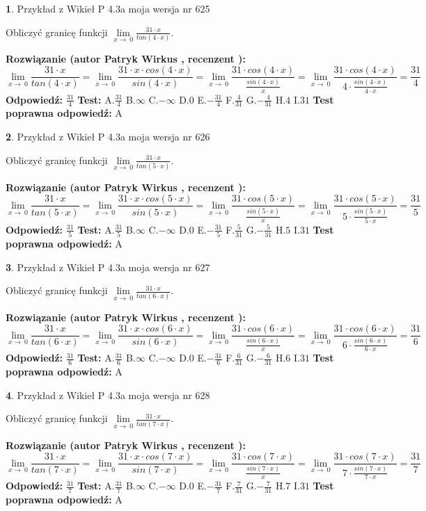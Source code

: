 \documentclass[12pt, a4paper]{article}
\theoremstyle{definition} %
\newtheorem{zad}{}
\newcommand{\zadStart}[1]{\begin{zad}#1\newline}
\newcommand{\zadStop}{\end{zad}}
\newcommand{\rozwStart}[2]{\noindent \textbf{Rozwiązanie (autor #1 , recenzent #2): }\newline}
\newcommand{\rozwStop}{\newline}
\newcommand{\odpStart}{\noindent \textbf{Odpowiedź:}\newline}
\newcommand{\odpStop}{\newline}
\newcommand{\testStart}{\noindent \textbf{Test:}\newline}
\newcommand{\testStop}{\newline}
\newcommand{\kluczStart}{\noindent \textbf{Test poprawna odpowiedź:}\newline}
\newcommand{\kluczStop}{\newline}
\begin{document}
\zadStart{Przykład z Wikieł P 4.3a moja wersja nr 625}


Obliczyć granicę funkcji $\lim\limits_{x\to\ 0}\frac{31 \cdot x}{tan(4 \cdot x)}$.
\zadStop
\rozwStart{Patryk Wirkus}{}
$$\lim\limits_{x\to\ 0}\frac{31 \cdot x}{tan(4 \cdot x)}=\lim\limits_{x\to\ 0}\frac{31 \cdot x \cdot cos(4 \cdot x)}{sin(4 \cdot x)}=\lim\limits_{x\to\ 0}\frac{31 \cdot cos(4 \cdot x)}{\frac{sin(4 \cdot x)}{x}}=\lim\limits_{x\to\ 0}\frac{31 \cdot cos(4 \cdot x)}{4 \cdot \frac{sin(4 \cdot x)}{4 \cdot x}} = \frac{31}{4}$$
\rozwStop
\odpStart
$\frac{31}{4}$
\odpStop
\testStart
A.$\frac{31}{4}$
B.$\infty$
C.$-\infty$
D.$0$
E.$-\frac{31}{4}$
F.$\frac{4}{31}$
G.$-\frac{4}{31}$
H.$4$
I.$31$
\testStop
\kluczStart
A
\kluczStop



\zadStart{Przykład z Wikieł P 4.3a moja wersja nr 626}


Obliczyć granicę funkcji $\lim\limits_{x\to\ 0}\frac{31 \cdot x}{tan(5 \cdot x)}$.
\zadStop
\rozwStart{Patryk Wirkus}{}
$$\lim\limits_{x\to\ 0}\frac{31 \cdot x}{tan(5 \cdot x)}=\lim\limits_{x\to\ 0}\frac{31 \cdot x \cdot cos(5 \cdot x)}{sin(5 \cdot x)}=\lim\limits_{x\to\ 0}\frac{31 \cdot cos(5 \cdot x)}{\frac{sin(5 \cdot x)}{x}}=\lim\limits_{x\to\ 0}\frac{31 \cdot cos(5 \cdot x)}{5 \cdot \frac{sin(5 \cdot x)}{5 \cdot x}} = \frac{31}{5}$$
\rozwStop
\odpStart
$\frac{31}{5}$
\odpStop
\testStart
A.$\frac{31}{5}$
B.$\infty$
C.$-\infty$
D.$0$
E.$-\frac{31}{5}$
F.$\frac{5}{31}$
G.$-\frac{5}{31}$
H.$5$
I.$31$
\testStop
\kluczStart
A
\kluczStop



\zadStart{Przykład z Wikieł P 4.3a moja wersja nr 627}


Obliczyć granicę funkcji $\lim\limits_{x\to\ 0}\frac{31 \cdot x}{tan(6 \cdot x)}$.
\zadStop
\rozwStart{Patryk Wirkus}{}
$$\lim\limits_{x\to\ 0}\frac{31 \cdot x}{tan(6 \cdot x)}=\lim\limits_{x\to\ 0}\frac{31 \cdot x \cdot cos(6 \cdot x)}{sin(6 \cdot x)}=\lim\limits_{x\to\ 0}\frac{31 \cdot cos(6 \cdot x)}{\frac{sin(6 \cdot x)}{x}}=\lim\limits_{x\to\ 0}\frac{31 \cdot cos(6 \cdot x)}{6 \cdot \frac{sin(6 \cdot x)}{6 \cdot x}} = \frac{31}{6}$$
\rozwStop
\odpStart
$\frac{31}{6}$
\odpStop
\testStart
A.$\frac{31}{6}$
B.$\infty$
C.$-\infty$
D.$0$
E.$-\frac{31}{6}$
F.$\frac{6}{31}$
G.$-\frac{6}{31}$
H.$6$
I.$31$
\testStop
\kluczStart
A
\kluczStop



\zadStart{Przykład z Wikieł P 4.3a moja wersja nr 628}


Obliczyć granicę funkcji $\lim\limits_{x\to\ 0}\frac{31 \cdot x}{tan(7 \cdot x)}$.
\zadStop
\rozwStart{Patryk Wirkus}{}
$$\lim\limits_{x\to\ 0}\frac{31 \cdot x}{tan(7 \cdot x)}=\lim\limits_{x\to\ 0}\frac{31 \cdot x \cdot cos(7 \cdot x)}{sin(7 \cdot x)}=\lim\limits_{x\to\ 0}\frac{31 \cdot cos(7 \cdot x)}{\frac{sin(7 \cdot x)}{x}}=\lim\limits_{x\to\ 0}\frac{31 \cdot cos(7 \cdot x)}{7 \cdot \frac{sin(7 \cdot x)}{7 \cdot x}} = \frac{31}{7}$$
\rozwStop
\odpStart
$\frac{31}{7}$
\odpStop
\testStart
A.$\frac{31}{7}$
B.$\infty$
C.$-\infty$
D.$0$
E.$-\frac{31}{7}$
F.$\frac{7}{31}$
G.$-\frac{7}{31}$
H.$7$
I.$31$
\testStop
\kluczStart
A
\kluczStop
\end{document}
